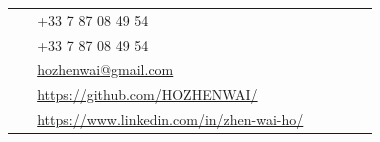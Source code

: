 \documentclass[10pt]{article} %
\begin{document}
\begin{paracol}{2}
\begin{supertabular}{rl}
	
	
\end{supertabular}

\medskip %


\switchcolumn %


\parbox[top][0.12\textheight][c]{\linewidth}{ %
	\vspace{-0.04\textheight} %
	\colorbox{shade}{ %
		\begin{supertabular}{p{0.05\linewidth}|p{0.775\linewidth}} %
			\raisebox{-1pt}{\faPhone} & +33 7 87 08 49 54 \\ %
			\raisebox{-1pt}{\faWechat} & +33 7 87 08 49 54 \\
			\raisebox{0pt}{\small\faEnvelope} & \href{mailto:hozhenwai@gmail.com}{hozhenwai@gmail.com} \\ %
			\raisebox{-1pt}{\faGithub} & \href{https://github.com/HOZHENWAI/}{https://github.com/HOZHENWAI/} \\ %
			\raisebox{-1pt}{\faLinkedinSquare} & \href{https://www.linkedin.com/in/zhen-wai-ho/}{https://www.linkedin.com/in/zhen-wai-ho/} \\ %
		\end{supertabular}
	}
}




\end{paracol}
\end{document}
